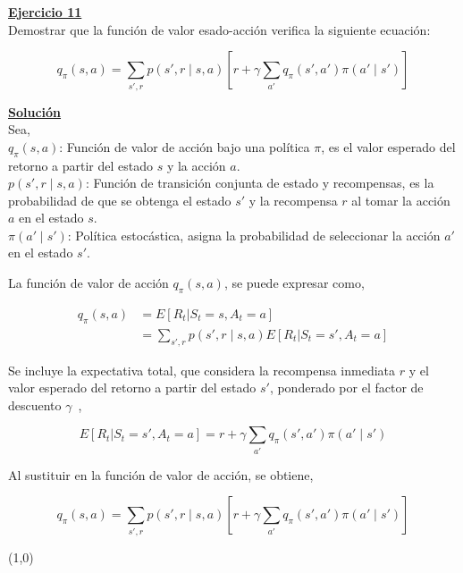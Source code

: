 \indent\underline{\textbf{Ejercicio 11}}\\
Demostrar que la función de valor esado-acción verifica la siguiente ecuación:

\[
    q_{\pi}(s,a) = \sum_{s',r} p(s',r \mid s,a)\left[ r + \gamma \sum_{a'} q_{\pi} (s',a') \pi (a' \mid s') \right]
\]

\indent\underline{\textbf{Solución}}\\
Sea,\\
$q_{\pi}(s,a)$: Función de valor de acción bajo una política $\pi$, es el valor esperado del retorno a partir del estado $s$ y la acción $a$.\\
$p(s',r \mid s,a)$: Función de transición conjunta de estado y recompensas, es la probabilidad de que se obtenga el estado $s'$ y la recompensa $r$ al tomar la acción $a$ en el estado $s$.\\
$\pi(a' \mid s')$: Política estocástica, asigna la probabilidad de seleccionar la acción $a'$ en el estado $s'$.

La función de valor de acción $q_{\pi}(s,a)$, se puede expresar como,

\begin{align*}
    q_{\pi}(s,a) &= E[R_t | S_t = s, A_t = a] \\
    &= \sum_{s',r} p(s',r \mid s,a) E[R_t | S_t = s', A_t = a]
\end{align*}

Se incluye la expectativa total, que considera la recompensa inmediata $r$ y el valor esperado del retorno a partir del estado $s'$, ponderado por el factor de descuento $\gamma$~\cite{Sutton2018},

\[
    E[R_t | S_t = s', A_t = a] = r + \gamma \sum_{a'} q_{\pi}(s',a') \pi(a' \mid s')
\]

Al sustituir en la función de valor de acción, se obtiene,

\[
    q_{\pi}(s,a) = \sum_{s',r} p(s',r \mid s,a) \left[ r + \gamma \sum_{a'} q_{\pi}(s',a') \pi(a' \mid s') \right]
\]

\line(1,0){\textwidth}
